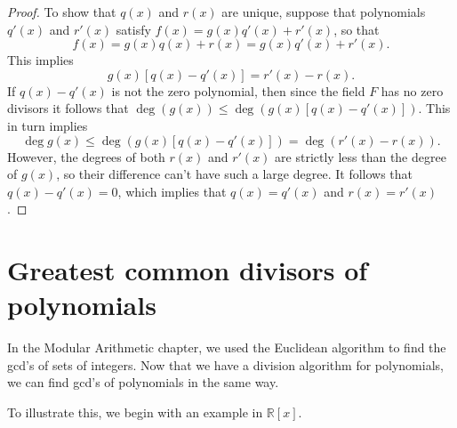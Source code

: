 \begin{proof}
To show that  $q(x)$ and $r(x)$ are unique, suppose that polynomials $q'(x)$ and $r'(x)$ satisfy $f(x) = g(x) q'(x)
+ r'(x)$, so that
\[
f(x) = g(x) q(x) + r(x) = g(x) q'(x) + r'(x).
\]
This implies
\[
g(x) [q(x) - q'(x) ] = r'(x) - r(x).
\]
If $q(x) - q'(x)$ is not the zero polynomial, then since the field $F$ has no zero divisors it follows that $ \deg( g(x)) \leq \deg( g(x) [q(x) - q'(x) ])$. This in turn implies
\[
\deg g(x) \leq \deg( g(x) [q(x) - q'(x) ] )= \deg( r'(x) - r(x) ).
\]
However, the degrees of both $r(x)$ and $r'(x)$ are strictly less than
the degree of $g(x)$, so their difference can't have such a large degree.  It follows that $q(x) - q'(x) = 0$, which implies that $q(x)=q'(x)$ and $r(x)=r'(x)$.
\end{proof}

\section{Greatest common divisors of polynomials}
In the Modular Arithmetic chapter, we used the Euclidean algorithm to find the gcd's of sets of integers. Now that we have a division algorithm for polynomials, we can find gcd's of polynomials in the same way. 

To illustrate this, we begin with an example in $\mathbb{R}[x]$.

